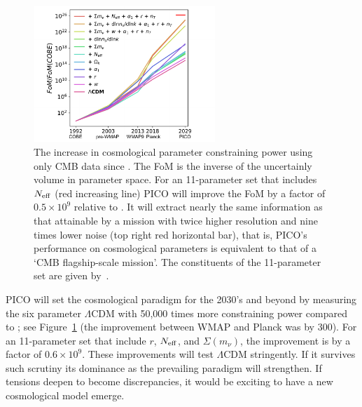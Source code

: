 \documentclass[PICOAPC.tex]{subfiles}
\begin{document}
\begin{figure}[h]
\hspace{-0.2in}
\parbox{2.7in}{\centerline {
\includegraphics[width=2.7in]{images/fom_plot_CVL+del.pdf} } }
\hspace{-0.17in}
\parbox{4.1in}{
\caption{\captiontext 
The increase in cosmological parameter constraining power using only CMB data since \cobe . The FoM is the inverse of the uncertainly volume in parameter space. 
For an 11-parameter set that includes ${N_{\rm eff}}$ (red increasing line) PICO will improve the FoM by a factor of $0.5\times10^{9}$ relative to \planck . It will extract nearly the same information as that attainable by a mission with twice higher resolution and nine times lower noise (top right red horizontal bar), that is, PICO's performance on cosmological parameters is equivalent to that of a `CMB flagship-scale mission'. The constituents of the 11-parameter set are given by~\citet{pico_report}. 
\label{fig:fom} } }
\vspace{-0.1in}
\end{figure}


PICO will set the cosmological paradigm for the 2030's and beyond by measuring the six parameter $\Lambda$CDM with 50,000 times more constraining power compared to \planck ; see Figure~\ref{fig:fom} (the improvement between WMAP and Planck was by 300). For an 11-parameter set that include $r$, ${N_{\rm eff}}$, and $\Sigma (m_{\nu})$, the improvement is by a factor of $0.6\times10^{9}$. These improvements will test $\Lambda$CDM stringently. If it survives such scrutiny its dominance as the prevailing paradigm will strengthen. If tensions deepen to become discrepancies, it would be exciting to have a new cosmological model emerge. 
\end{document}
